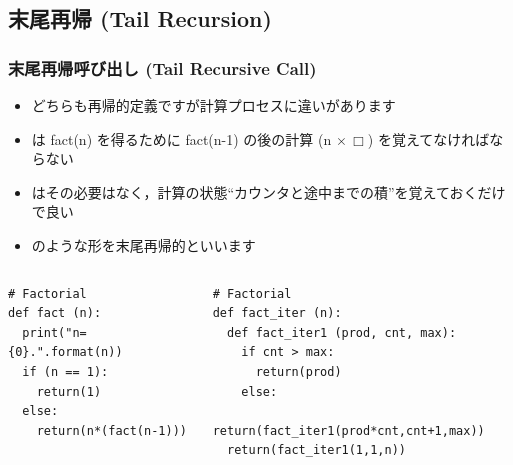 \subsection{末尾再帰 (Tail Recursion)}
\begin{frame}
\frametitle{末尾再帰呼び出し (Tail Recursive Call)}
  \begin{itemize}
\item どちらも再帰的定義ですが計算プロセスに違いがあります
\item {} は fact(n) を得るために fact(n-1) の後の計算 (n  $\times\,\Box$) を覚えてなければならない
\item {} はその必要はなく，計算の状態``カウンタと途中までの積''を覚えておくだけで良い
\item {} のような形を末尾再帰的といいます
  \end{itemize}
\vspace{-2zw}
  \begin{columns}[t]
    \begin{column}{0.45\textwidth}
      \begin{lstlisting}[caption={再帰プロセス版},label=fact-rec1]
# Factorial
def fact (n):
  print("n={0}.".format(n))
  if (n == 1):
    return(1)
  else:
    return(n*(fact(n-1)))
      \end{lstlisting}
    \end{column}
    \begin{column}{0.5\textwidth}
      \begin{lstlisting}[firstnumber=16,caption={繰り返しプロセス版},label=fact-iter]
# Factorial
def fact_iter (n):
  def fact_iter1 (prod, cnt, max):
    if cnt > max:
      return(prod)
    else:
      return(fact_iter1(prod*cnt,cnt+1,max))
  return(fact_iter1(1,1,n))
      \end{lstlisting}
    \end{column}
  \end{columns}
\end{frame}
